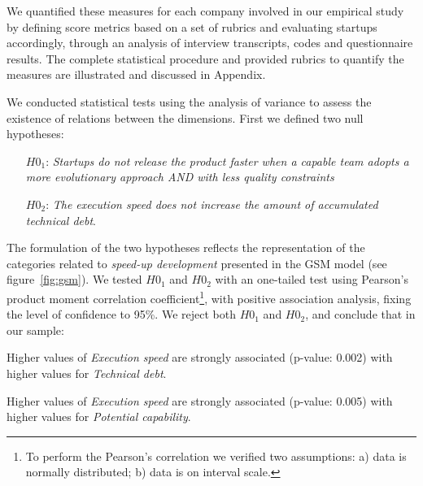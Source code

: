 \documentclass[10pt,journal,letterpaper,compsoc]{IEEEtran}
\begin{document}
We quantified these measures for each company involved in our empirical study
by defining score metrics based on a set of rubrics and evaluating startups
accordingly, through an analysis of interview transcripts, codes and
questionnaire results. The complete statistical procedure and provided rubrics
to quantify the measures are illustrated and discussed in Appendix. 

We conducted statistical tests using the analysis of
variance to assess the existence of relations between the dimensions. First we
defined two null hypotheses:

\begin{itemize} 
\item[$H0_1$:] \textit{Startups do not release the product
faster when a capable team adopts a more evolutionary approach AND with less
quality constraints} 
\item[$H0_2$:] \textit{The execution speed does not
increase the amount of accumulated technical debt}.
\end{itemize}

The formulation of the two hypotheses reflects the representation of the
categories related to \textit{speed-up development} presented in the GSM model
(see figure~\ref{fig:gsm}). We tested $H0_1$ and $H0_2$ with an one-tailed
test using Pearson's product moment correlation coefficient\footnote{To perform
the Pearson's correlation we verified two assumptions: a) data is normally
distributed; b) data is on interval scale.}, with positive association
analysis, fixing the level of confidence to 95\%. We reject both $H0_1$ and
$H0_2$, and conclude that in our sample: 
\begin{compactenum}
\item Higher values of \textit{Execution speed} are strongly associated 
(p-value: 0.002) with higher values for \textit{Technical debt}.

\item Higher values of \textit{Execution speed} are strongly associated
(p-value: 0.005) with higher values for \textit{Potential capability}.
\end{compactenum}
\end{document}
